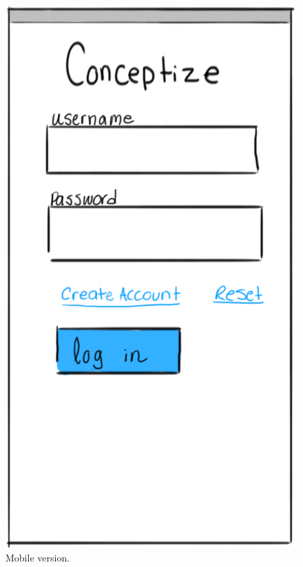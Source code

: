 \documentclass[]{article}
\begin{document}
\begin{enumerate}
			\begin{figure}
			  \includegraphics[width=\linewidth]{./pictures/login_mobile.png}
			  \caption{Mobile version.}
			  \label{fig:mobile2}
			\end{figure}
			

\end{enumerate}
\end{document}
